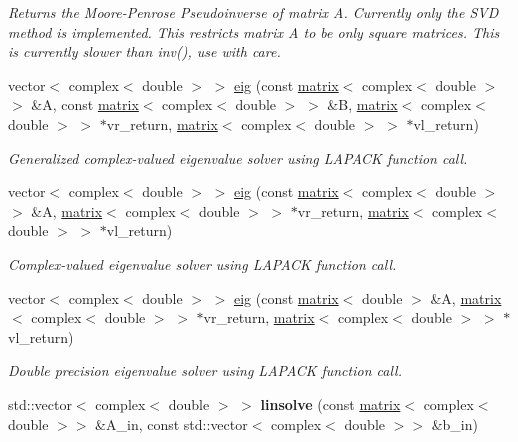 \begin{DoxyCompactItemize}
\begin{DoxyCompactList}\small\item\em Returns the Moore-\/\-Penrose Pseudoinverse of matrix A. Currently only the S\-V\-D method is implemented. This restricts matrix A to be only square matrices. This is currently slower than inv(), use with care. \end{DoxyCompactList}\item 
vector$<$ complex$<$ double $>$ $>$ \hyperlink{namespacekeycpp_a524691df2a648a59b3be9f2b2362bbe8}{eig} (const \hyperlink{classkeycpp_1_1matrix}{matrix}$<$ complex$<$ double $>$ $>$ \&A, const \hyperlink{classkeycpp_1_1matrix}{matrix}$<$ complex$<$ double $>$ $>$ \&B, \hyperlink{classkeycpp_1_1matrix}{matrix}$<$ complex$<$ double $>$ $>$ $\ast$vr\-\_\-return, \hyperlink{classkeycpp_1_1matrix}{matrix}$<$ complex$<$ double $>$ $>$ $\ast$vl\-\_\-return)
\begin{DoxyCompactList}\small\item\em Generalized complex-\/valued eigenvalue solver using L\-A\-P\-A\-C\-K function call. \end{DoxyCompactList}\item 
vector$<$ complex$<$ double $>$ $>$ \hyperlink{namespacekeycpp_ab2aef1f33c78911d0ebcd77f9c9841fe}{eig} (const \hyperlink{classkeycpp_1_1matrix}{matrix}$<$ complex$<$ double $>$ $>$ \&A, \hyperlink{classkeycpp_1_1matrix}{matrix}$<$ complex$<$ double $>$ $>$ $\ast$vr\-\_\-return, \hyperlink{classkeycpp_1_1matrix}{matrix}$<$ complex$<$ double $>$ $>$ $\ast$vl\-\_\-return)
\begin{DoxyCompactList}\small\item\em Complex-\/valued eigenvalue solver using L\-A\-P\-A\-C\-K function call. \end{DoxyCompactList}\item 
vector$<$ complex$<$ double $>$ $>$ \hyperlink{namespacekeycpp_a7cc3fb9ca244e5caac42cf94013ddf94}{eig} (const \hyperlink{classkeycpp_1_1matrix}{matrix}$<$ double $>$ \&A, \hyperlink{classkeycpp_1_1matrix}{matrix}$<$ complex$<$ double $>$ $>$ $\ast$vr\-\_\-return, \hyperlink{classkeycpp_1_1matrix}{matrix}$<$ complex$<$ double $>$ $>$ $\ast$vl\-\_\-return)
\begin{DoxyCompactList}\small\item\em Double precision eigenvalue solver using L\-A\-P\-A\-C\-K function call. \end{DoxyCompactList}\item 
\hypertarget{namespacekeycpp_acea0bb8f128ef0cdf55a79c50ceccb83}{std\-::vector$<$ complex$<$ double $>$ $>$ {\bfseries linsolve} (const \hyperlink{classkeycpp_1_1matrix}{matrix}$<$ complex$<$ double $>$$>$ \&A\-\_\-in, const std\-::vector$<$ complex$<$ double $>$$>$ \&b\-\_\-in)}\label{namespacekeycpp_acea0bb8f128ef0cdf55a79c50ceccb83}


\end{DoxyCompactItemize}
